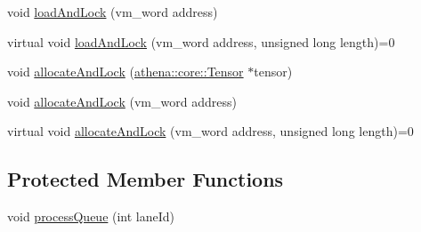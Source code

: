 \begin{DoxyCompactItemize}
\item 
void \mbox{\hyperlink{classathena_1_1backend_1_1generic_1_1_generic_memory_manager_a47ea5a77f81f91f803f748720c5c19b5}{load\+And\+Lock}} (vm\+\_\+word address)
\item 
virtual void \mbox{\hyperlink{classathena_1_1backend_1_1generic_1_1_generic_memory_manager_a9fe52e4020802d6f526fba06adce8407}{load\+And\+Lock}} (vm\+\_\+word address, unsigned long length)=0
\item 
void \mbox{\hyperlink{classathena_1_1backend_1_1generic_1_1_generic_memory_manager_ad40a653a8b32410956ba835ca1bb3e5f}{allocate\+And\+Lock}} (\mbox{\hyperlink{classathena_1_1core_1_1_tensor}{athena\+::core\+::\+Tensor}} $\ast$tensor)
\item 
void \mbox{\hyperlink{classathena_1_1backend_1_1generic_1_1_generic_memory_manager_ab5305b3d1ab91960bf179ce0be166120}{allocate\+And\+Lock}} (vm\+\_\+word address)
\item 
virtual void \mbox{\hyperlink{classathena_1_1backend_1_1generic_1_1_generic_memory_manager_a1b80008e94c21d5ac87f9a45d3f212a8}{allocate\+And\+Lock}} (vm\+\_\+word address, unsigned long length)=0
\end{DoxyCompactItemize}
\subsection*{Protected Member Functions}
\begin{DoxyCompactItemize}
\item 
void \mbox{\hyperlink{classathena_1_1backend_1_1generic_1_1_generic_memory_manager_a978be661a46caaa8f6ef40a2c45a014e}{process\+Queue}} (int lane\+Id)
\end{DoxyCompactItemize}
